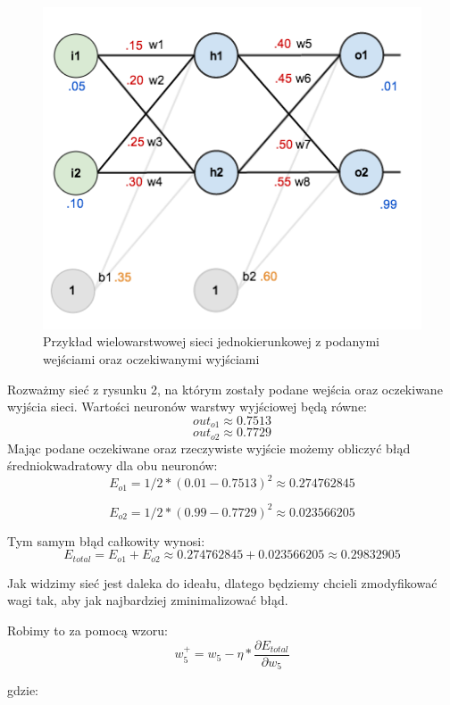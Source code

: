 \begin{figure}[!ht]
  \includegraphics[width=\linewidth]{images/feed-forward-diagram-with-values.png}
  \caption{Przykład wielowarstwowej sieci jednokierunkowej z podanymi wejściami oraz oczekiwanymi wyjściami}
\end{figure}

Rozważmy sieć z rysunku 2, na którym zostały podane wejścia oraz oczekiwane wyjścia sieci.
Wartości neuronów warstwy wyjściowej będą równe:
\[
    out_{o1} \approx 0.7513
\]
\[
    out_{o2} \approx 0.7729
\]
Mając podane oczekiwane oraz rzeczywiste wyjście możemy obliczyć błąd średniokwadratowy dla obu neuronów:
\[
    E_{o1} = 1/2 * (0.01-0.7513)^2 \approx 0.274762845 
\]

\[
    E_{o2} = 1/2 * (0.99-0.7729)^2 \approx 0.023566205 
\]

Tym samym błąd całkowity wynosi:
\[
    E_{total} = E_{o1}+E_{o2} \approx 0.274762845 + 0.023566205 \approx 0.29832905
\]

Jak widzimy sieć jest daleka do ideału, dlatego będziemy chcieli zmodyfikować wagi tak,
aby jak najbardziej zminimalizować błąd.

Robimy to za pomocą wzoru:
\[
  w_5^{+} = w_5 - \eta * \frac{\partial E_{total}}{\partial w_{5}}
\]

gdzie:









